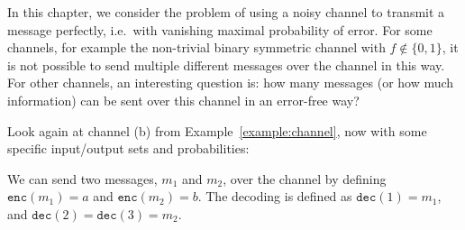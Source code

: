 \newcommand{\enc}[1]{\mathtt{enc}(#1)}
\newcommand{\dec}[1]{\mathtt{dec}(#1)}

In this chapter, we consider the problem of using a noisy channel to transmit a message perfectly, i.e.\ with vanishing maximal probability of error. For some channels, for example the non-trivial binary symmetric channel with $f \not\in \{0,1\}$, it is not possible to send multiple different messages over the channel in this way. For other channels, an interesting question is: how many messages (or how much information) can be sent over this channel in an error-free way?

\begin{example}
Look again at channel (b) from Example~\ref{example:channel}, now with some specific input/output sets and probabilities:
\begin{center}
\end{center}
We can send two messages, $m_1$ and $m_2$, over the channel by defining $\enc{m_1} = a$ and $\enc{m_2} = b$. The decoding is defined as $\dec{1} = m_1$, and $\dec{2} = \dec{3} = m_2$.
\end{example}


